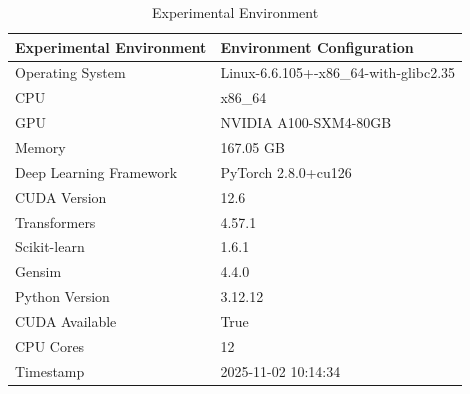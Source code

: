 \begin{table}
\caption{Experimental Environment}
\label{tab:env}
\begin{tabular}{ll}
\toprule
Experimental Environment & Environment Configuration \\
\midrule
Operating System & Linux-6.6.105+-x86_64-with-glibc2.35 \\
CPU & x86_64 \\
GPU & NVIDIA A100-SXM4-80GB \\
Memory & 167.05 GB \\
Deep Learning Framework & PyTorch 2.8.0+cu126 \\
CUDA Version & 12.6 \\
Transformers & 4.57.1 \\
Scikit-learn & 1.6.1 \\
Gensim & 4.4.0 \\
Python Version & 3.12.12 \\
CUDA Available & True \\
CPU Cores & 12 \\
Timestamp & 2025-11-02 10:14:34 \\
\bottomrule
\end{tabular}
\end{table}
